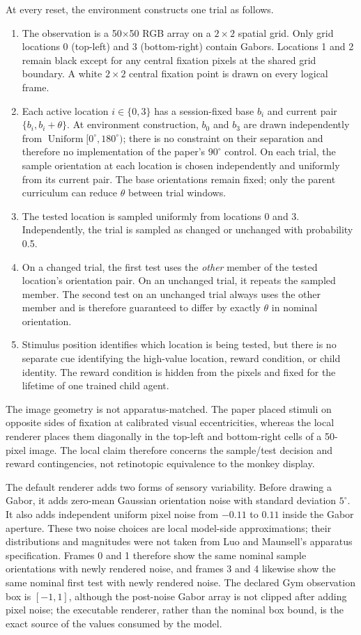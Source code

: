 \documentclass[10pt]{article}
\begin{document}
At every reset, the environment constructs one trial as follows.
\begin{enumerate}[leftmargin=1.5em,itemsep=3pt]
\item The observation is a 50$\times$50 RGB array on a $2\times2$ spatial grid. Only grid locations 0 (top-left) and 3 (bottom-right) contain Gabors. Locations 1 and 2 remain black except for any central fixation pixels at the shared grid boundary. A white $2\times2$ central fixation point is drawn on every logical frame.
\item Each active location $i\in\{0,3\}$ has a session-fixed base $b_i$ and current pair $\{b_i,b_i+\theta\}$. At environment construction, $b_0$ and $b_3$ are drawn independently from $\operatorname{Uniform}[0^\circ,180^\circ)$; there is no constraint on their separation and therefore no implementation of the paper's $90^\circ$ control. On each trial, the sample orientation at each location is chosen independently and uniformly from its current pair. The base orientations remain fixed; only the parent curriculum can reduce $\theta$ between trial windows.
\item The tested location is sampled uniformly from locations 0 and 3. Independently, the trial is sampled as changed or unchanged with probability 0.5.
\item On a changed trial, the first test uses the \emph{other} member of the tested location's orientation pair. On an unchanged trial, it repeats the sampled member. The second test on an unchanged trial always uses the other member and is therefore guaranteed to differ by exactly $\theta$ in nominal orientation.
\item Stimulus position identifies which location is being tested, but there is no separate cue identifying the high-value location, reward condition, or child identity. The reward condition is hidden from the pixels and fixed for the lifetime of one trained child agent.
\end{enumerate}

The image geometry is not apparatus-matched. The paper placed stimuli on opposite sides of fixation at calibrated visual eccentricities, whereas the local renderer places them diagonally in the top-left and bottom-right cells of a 50-pixel image. The local claim therefore concerns the sample/test decision and reward contingencies, not retinotopic equivalence to the monkey display.

The default renderer adds two forms of sensory variability. Before drawing a Gabor, it adds zero-mean Gaussian orientation noise with standard deviation $5^\circ$. It also adds independent uniform pixel noise from $-0.11$ to $0.11$ inside the Gabor aperture. These two noise choices are local model-side approximations; their distributions and magnitudes were not taken from Luo and Maunsell's apparatus specification. Frames 0 and 1 therefore show the same nominal sample orientations with newly rendered noise, and frames 3 and 4 likewise show the same nominal first test with newly rendered noise. The declared Gym observation box is $[-1,1]$, although the post-noise Gabor array is not clipped after adding pixel noise; the executable renderer, rather than the nominal box bound, is the exact source of the values consumed by the model.
\end{document}
